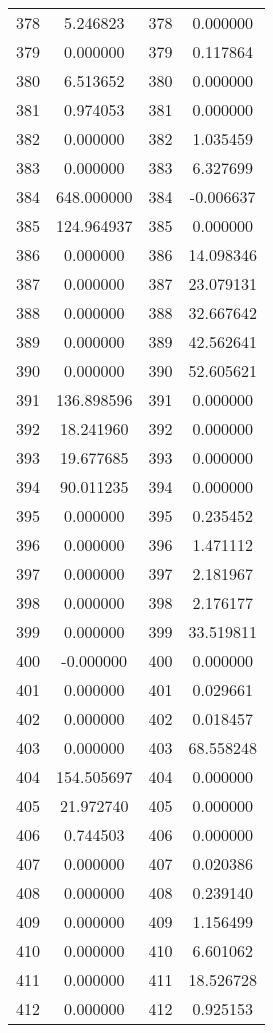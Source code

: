 \documentclass[12pt]{article}
\begin{document}
\begin{longtable}{@{}cccc@{}}
378 & 5.246823 & 378 & 0.000000 \\
379 & 0.000000 & 379 & 0.117864 \\
380 & 6.513652 & 380 & 0.000000 \\
381 & 0.974053 & 381 & 0.000000 \\
382 & 0.000000 & 382 & 1.035459 \\
383 & 0.000000 & 383 & 6.327699 \\
384 & 648.000000 & 384 & -0.006637 \\
385 & 124.964937 & 385 & 0.000000 \\
386 & 0.000000 & 386 & 14.098346 \\
387 & 0.000000 & 387 & 23.079131 \\
388 & 0.000000 & 388 & 32.667642 \\
389 & 0.000000 & 389 & 42.562641 \\
390 & 0.000000 & 390 & 52.605621 \\
391 & 136.898596 & 391 & 0.000000 \\
392 & 18.241960 & 392 & 0.000000 \\
393 & 19.677685 & 393 & 0.000000 \\
394 & 90.011235 & 394 & 0.000000 \\
395 & 0.000000 & 395 & 0.235452 \\
396 & 0.000000 & 396 & 1.471112 \\
397 & 0.000000 & 397 & 2.181967 \\
398 & 0.000000 & 398 & 2.176177 \\
399 & 0.000000 & 399 & 33.519811 \\
400 & -0.000000 & 400 & 0.000000 \\
401 & 0.000000 & 401 & 0.029661 \\
402 & 0.000000 & 402 & 0.018457 \\
403 & 0.000000 & 403 & 68.558248 \\
404 & 154.505697 & 404 & 0.000000 \\
405 & 21.972740 & 405 & 0.000000 \\
406 & 0.744503 & 406 & 0.000000 \\
407 & 0.000000 & 407 & 0.020386 \\
408 & 0.000000 & 408 & 0.239140 \\
409 & 0.000000 & 409 & 1.156499 \\
410 & 0.000000 & 410 & 6.601062 \\
411 & 0.000000 & 411 & 18.526728 \\
412 & 0.000000 & 412 & 0.925153 \\

\end{longtable}
\end{document}
